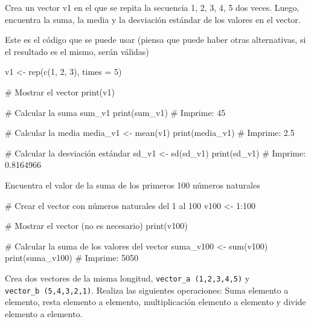 \documentclass[
  letterpaper,
  DIV=11,
  numbers=noendperiod]{scrreprt}
\newenvironment{Shaded}{\begin{snugshade}}{\end{snugshade}}
\newcommand{\AttributeTok}[1]{\textcolor[rgb]{0.40,0.45,0.13}{#1}}
\newcommand{\CommentTok}[1]{\textcolor[rgb]{0.37,0.37,0.37}{#1}}
\newcommand{\DecValTok}[1]{\textcolor[rgb]{0.68,0.00,0.00}{#1}}
\newcommand{\FunctionTok}[1]{\textcolor[rgb]{0.28,0.35,0.67}{#1}}
\newcommand{\NormalTok}[1]{\textcolor[rgb]{0.00,0.23,0.31}{#1}}
\newcommand{\OtherTok}[1]{\textcolor[rgb]{0.00,0.23,0.31}{#1}}
\newcommand{\SpecialCharTok}[1]{\textcolor[rgb]{0.37,0.37,0.37}{#1}}
\begin{document}
Crea un vector v1 en el que se repita la secuencia 1, 2, 3, 4, 5 dos
veces. Luego, encuentra la suma, la media y la desviación estándar de
los valores en el vector.

Este es el código que se puede usar (piensa que puede haber otras
alternativas, si el resultado es el mismo, serán válidas)

\begin{Shaded}
\begin{Highlighting}[]
\NormalTok{v1 }\OtherTok{\textless{}{-}} \FunctionTok{rep}\NormalTok{(}\FunctionTok{c}\NormalTok{(}\DecValTok{1}\NormalTok{, }\DecValTok{2}\NormalTok{, }\DecValTok{3}\NormalTok{), }\AttributeTok{times =} \DecValTok{5}\NormalTok{)}

\CommentTok{\# Mostrar el vector}
\FunctionTok{print}\NormalTok{(v1)}


\CommentTok{\# Calcular la suma}
\NormalTok{sum\_v1}
\FunctionTok{print}\NormalTok{(sum\_v1)}
\CommentTok{\# Imprime: 45}

\CommentTok{\# Calcular la media}
\NormalTok{media\_v1 }\OtherTok{\textless{}{-}} \FunctionTok{mean}\NormalTok{(v1)}
\FunctionTok{print}\NormalTok{(media\_v1)}
\CommentTok{\# Imprime: 2.5}

\CommentTok{\# Calcular la desviación estándar}
\NormalTok{sd\_v1 }\OtherTok{\textless{}{-}} \FunctionTok{sd}\NormalTok{(sd\_v1)}
\FunctionTok{print}\NormalTok{(sd\_v1)}
\CommentTok{\# Imprime: 0.8164966}
\end{Highlighting}
\end{Shaded}

Encuentra el valor de la suma de los primeros 100 números naturales

\begin{Shaded}
\begin{Highlighting}[]
\CommentTok{\# Crear el vector con números naturales del 1 al 100}
\NormalTok{v100 }\OtherTok{\textless{}{-}} \DecValTok{1}\SpecialCharTok{:}\DecValTok{100}

\CommentTok{\# Mostrar el vector (no es necesario)}
\FunctionTok{print}\NormalTok{(v100)}

\CommentTok{\# Calcular la suma de los valores del vector}
\NormalTok{suma\_v100 }\OtherTok{\textless{}{-}} \FunctionTok{sum}\NormalTok{(v100)}
\FunctionTok{print}\NormalTok{(suma\_v100)}
\CommentTok{\# Imprime: 5050}
\end{Highlighting}
\end{Shaded}

Crea dos vectores de la misma longitud, \texttt{vector\_a\ (1,2,3,4,5)}
y \texttt{vector\_b\ (5,4,3,2,1)}. Realiza las siguientes operaciones:
Suma elemento a elemento, resta elemento a elemento, multiplicación
elemento a elemento y divide elemento a elemento.
\end{document}
